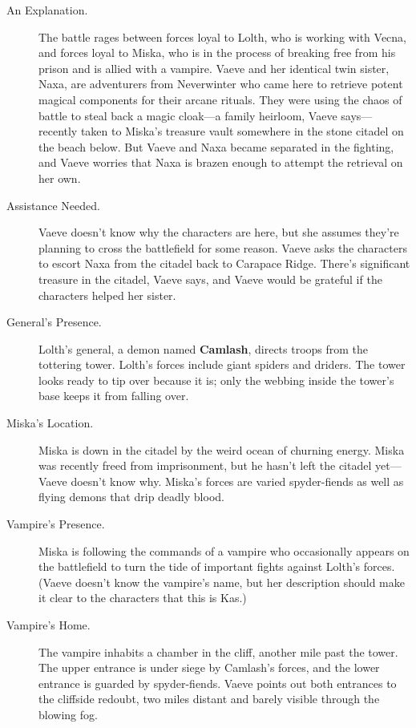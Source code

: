 \documentclass[10pt,a4paper,twoside,bg=print,twocolumn,openany,nodeprecatedcode]{dndbook}
\begin{document}
\begin{description}
\item[An Explanation.]
The battle rages between forces loyal to Lolth, who is working with Vecna, and forces loyal to Miska, who is in the process of breaking free from his prison and is allied with a vampire. Vaeve and her identical twin sister, Naxa, are adventurers from Neverwinter who came here to retrieve potent magical components for their arcane rituals. They were using the chaos of battle to steal back a magic cloak—a family heirloom, Vaeve says—recently taken to Miska's treasure vault somewhere in the stone citadel on the beach below. But Vaeve and Naxa became separated in the fighting, and Vaeve worries that Naxa is brazen enough to attempt the retrieval on her own.
\item[Assistance Needed.]
Vaeve doesn't know why the characters are here, but she assumes they're planning to cross the battlefield for some reason. Vaeve asks the characters to escort Naxa from the citadel back to Carapace Ridge. There's significant treasure in the citadel, Vaeve says, and Vaeve would be grateful if the characters helped her sister.
\item[General's Presence.]
Lolth's general, a demon named \textbf{Camlash}, directs troops from the tottering tower. Lolth's forces include giant spiders and driders. The tower looks ready to tip over because it is; only the webbing inside the tower's base keeps it from falling over.
\item[Miska's Location.]
Miska is down in the citadel by the weird ocean of churning energy. Miska was recently freed from imprisonment, but he hasn't left the citadel yet—Vaeve doesn't know why. Miska's forces are varied spyder-fiends as well as flying demons that drip deadly blood.
\item[Vampire's Presence.]
Miska is following the commands of a vampire who occasionally appears on the battlefield to turn the tide of important fights against Lolth's forces. (Vaeve doesn't know the vampire's name, but her description should make it clear to the characters that this is Kas.)
\item[Vampire's Home.]
The vampire inhabits a chamber in the cliff, another mile past the tower. The upper entrance is under siege by Camlash's forces, and the lower entrance is guarded by spyder-fiends. Vaeve points out both entrances to the cliffside redoubt, two miles distant and barely visible through the blowing fog.
\end{description}
\end{document}
